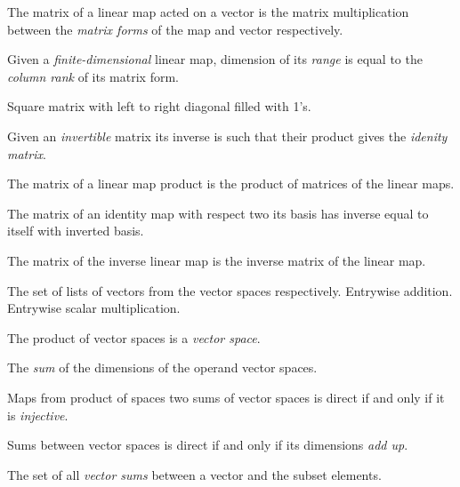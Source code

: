 \begin{multicols}{3}
  
  The matrix of a linear map acted on a vector is the matrix multiplication between
  the \textit{matrix forms} of the map and vector respectively.
  
  Given a \textit{finite-dimensional} linear map,
  dimension of its \textit{range} is equal to the \textit{column rank} of its matrix form.
  
  Square matrix with left to right diagonal filled with 1's.

  Given an \textit{invertible} matrix its inverse is such that their product gives the \textit{idenity matrix}.

  The matrix of a linear map product is the product of matrices of the linear maps.
  
  The matrix of an identity map with respect two its basis
  has inverse equal to itself with inverted basis.
  
  
  The matrix of the inverse linear map is the inverse matrix of the linear map.


  The set of lists of vectors from the vector spaces respectively.
  Entrywise addition.
  Entrywise scalar multiplication.

  The product of vector spaces is a \textit{vector space}.

  The \textit{sum} of the dimensions of the operand vector spaces.

  Maps from product of spaces two sums of vector spaces is direct if and only if it is \textit{injective}.

  Sums between vector spaces is direct if and only if its dimensions \textit{add up}.

  The set of all \textit{vector sums} between a vector and the subset elements.


\end{multicols}
